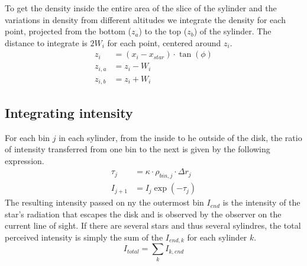 \documentclass[a4paper, 12pt, english, titlepage]{article}
\newcommand{\erf}[1]{\textrm{erf}\left(#1\right)} %
\newcommand{\D}[1]{\ \mathrm{d}#1} %
\begin{document}
        To get the density inside the entire area of the slice of the sylinder and the variations in density from different altitudes we integrate the density for each point, projected from the bottom ($z_a$) to the top ($z_b$) of the sylinder. The distance to integrate is $2W_i$ for each point, centered around $z_i$.
        \begin{align*}
            z_i &= (x_i - x_{star}) \cdot \tan(\phi) \\
            z_{i,a} &= z_i - W_i \\
            z_{i,b} &= z_i + W_i
        \end{align*}



\subsection{Integrating intensity}
    For each bin $j$ in each sylinder, from the inside to he outside of the disk, the ratio of intensity transferred from one bin to the next is given by the following expression.
    \begin{align*}
        \tau_j &= \kappa \cdot \rho_{bin,j} \cdot \Delta r_j \\
        I_{j+1} &= I_j \exp(-\tau_j)
    \end{align*}
    The resulting intensity passed on ny the outermost bin $I_{end}$ is the intensity of the star's radiation that escapes the disk and is observed by the observer on the current line of sight. If there are several stars and thus several sylindres, the total perceived intensity is simply the sum of the $I_{end,k}$ for each sylinder $k$.
    $$
    I_{total} = \sum_k I_{k,end}
    $$
\end{document}
